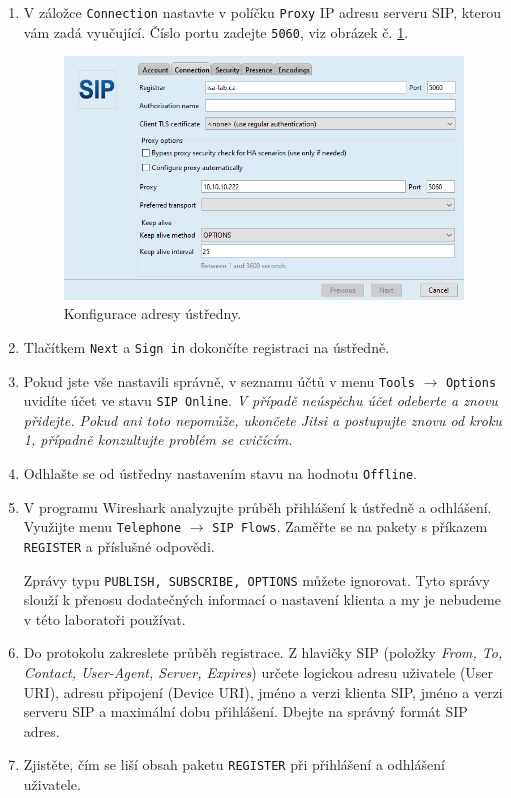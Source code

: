 \documentclass[a4paper,11pt]{article}
\begin{document}
\begin{enumerate}
    \item V záložce {\tt Connection} nastavte v políčku {\tt Proxy} IP adresu serveru SIP, kterou vám zadá vyučující. 
      Číslo portu zadejte {\tt 5060}, viz obrázek č. \ref{fig:registration2}. 
      \begin{figure}[h!]
        \centering
        \includegraphics[scale=0.6]{img/jitsi-registration2b.png}
        \caption{Konfigurace adresy ústředny.}
        \label{fig:registration2}
      \end{figure}
    \item Tlačítkem {\tt Next} a {\tt Sign in} dokončíte registraci na ústředně.
    \item  Pokud jste vše nastavili správně, v seznamu účtů v menu {\tt Tools} $\rightarrow$ {\tt Options} uvidíte účet ve stavu {\tt SIP Online}. {\it V případě neúspěchu účet odeberte a znovu přidejte. Pokud ani toto nepomůže, ukončete Jitsi a postupujte znovu od kroku 1, případně konzultujte problém se cvičícím.}
    \item Odhlašte se od ústředny nastavením stavu na hodnotu {\tt Offline}. 
    \item V programu Wireshark analyzujte průběh přihlášení k ústředně a odhlášení. Využijte menu {\tt Telephone} $\rightarrow$ {\tt SIP Flows}. Zaměřte se na pakety s příkazem {\tt REGISTER} a příslušné odpovědi.

      {\small Zprávy typu {\tt PUBLISH, SUBSCRIBE, OPTIONS} můžete ignorovat. Tyto správy slouží k přenosu dodatečných informací o nastavení klienta a my je nebudeme v této laboratoři používat.}
    \item Do protokolu zakreslete průběh registrace. Z hlavičky SIP (položky {\em From, To, Contact, User-Agent, Server, Expires}) určete logickou adresu uživatele (User URI), adresu připojení (Device URI), jméno a verzi klienta SIP, jméno a verzi serveru SIP a maximální dobu přihlášení. Dbejte na správný formát SIP adres.
    \item Zjistěte, čím se liší obsah paketu {\tt REGISTER} při přihlášení a odhlášení uživatele.
\end{enumerate}
\end{document}
